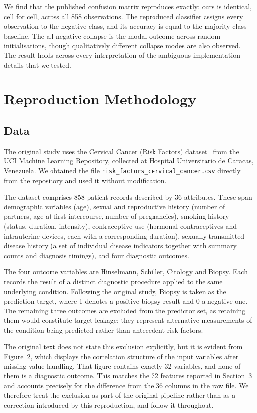We find that the published confusion matrix reproduces exactly: ours is
identical, cell for cell, across all 858 observations. The reproduced
classifier assigns every observation to the negative class, and its accuracy is
equal to the majority-class baseline. The all-negative collapse is the modal outcome across random initialisations,
though qualitatively different collapse modes are also observed. The result
holds across every interpretation of the ambiguous implementation details that
we tested.

\section{Reproduction Methodology}\label{sec:methods}

\subsection{Data}\label{sec:data}

The original study uses the Cervical Cancer (Risk Factors)
dataset~\cite{fernandes2017} from the UCI Machine Learning Repository,
collected at Hospital Universitario de Caracas, Venezuela. We obtained the file
\texttt{risk\_factors\_cervical\_cancer.csv} directly from the repository and
used it without modification.

The dataset comprises 858 patient records described by 36 attributes. These
span demographic variables (age), sexual and reproductive history (number of
partners, age at first intercourse, number of pregnancies), smoking history
(status, duration, intensity), contraceptive use (hormonal contraceptives and
intrauterine devices, each with a corresponding duration), sexually transmitted
disease history (a set of individual disease indicators together with summary
counts and diagnosis timings), and four diagnostic outcomes.

The four outcome variables are Hinselmann, Schiller, Citology and Biopsy. Each
records the result of a distinct diagnostic procedure applied to the same
underlying condition. Following the original study, Biopsy is taken as the
prediction target, where 1 denotes a positive biopsy result and 0 a negative
one. The remaining three outcomes are excluded from the predictor set, as
retaining them would constitute target leakage: they represent alternative
measurements of the condition being predicted rather than antecedent risk
factors.

The original text does not state this exclusion explicitly, but it is evident
from Figure~2, which displays the correlation structure of the input variables
after missing-value handling. That figure contains exactly 32 variables, and
none of them is a diagnostic outcome. This matches the 32 features reported in
Section~3 and accounts precisely for the difference from the 36 columns in the
raw file. We therefore treat the exclusion as part of the original pipeline
rather than as a correction introduced by this reproduction, and follow it
throughout.

